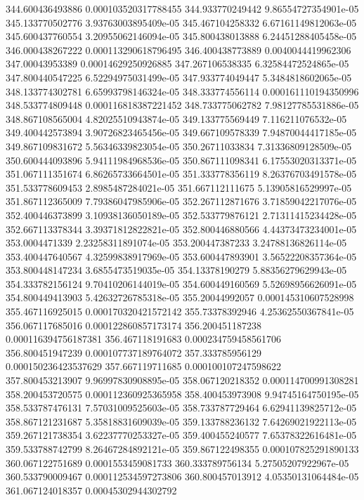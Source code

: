 {344.600436493886 0.000103520317788455
344.933770249442 9.86554727354901e-05
345.133770502776 3.93763003895409e-05
345.467104258332 6.67161149812063e-05
345.600437760554 3.20955062146094e-05
345.800438013888 6.24451288405458e-05
346.000438267222 0.000113290618796495
346.400438773889 0.0040044419962306
347.00043953389 0.00014629250926885
347.267106538335 6.32584472524865e-05
347.800440547225 6.52294975031499e-05
347.933774049447 5.3484818602065e-05
348.133774302781 6.65993798146324e-05
348.333774556114 0.000161110194350996
348.533774809448 0.000116818387221452
348.733775062782 7.98127785531886e-05
348.867108565004 4.82025510943874e-05
349.133775569449 7.116211076532e-05
349.400442573894 3.90726823465456e-05
349.667109578339 7.94870044417185e-05
349.867109831672 5.56346339823054e-05
350.26711033834 7.31336809128509e-05
350.600444093896 5.94111984968536e-05
350.867111098341 6.17553020313371e-05
351.067111351674 6.86265733664501e-05
351.333778356119 8.26376703491578e-05
351.533778609453 2.8985487284021e-05
351.667112111675 5.13905816529997e-05
351.867112365009 7.79386047985906e-05
352.267112871676 3.71859042217076e-05
352.400446373899 3.10938136050189e-05
352.533779876121 2.71311415234428e-05
352.667113378344 3.39371812822821e-05
352.800446880566 4.44373473234001e-05
353.0004471339 2.23258311891074e-05
353.200447387233 3.24788136826114e-05
353.400447640567 4.32599838917969e-05
353.600447893901 3.56522208357364e-05
353.800448147234 3.6855473519035e-05
354.13378190279 5.88356279629943e-05
354.333782156124 9.70410206144019e-05
354.600449160569 5.52698956626091e-05
354.800449413903 5.42632726785318e-05
355.20044992057 0.000145310607528998
355.467116925015 0.000170320421572142
355.73378392946 4.25362550367841e-05
356.067117685016 0.000122860857173174
356.200451187238 0.000116394756187381
356.467118191683 0.000234759458561706
356.800451947239 0.000107737189764072
357.333785956129 0.000150236423537629
357.667119711685 0.000100107247598622
357.800453213907 9.96997830908895e-05
358.067120218352 0.000114700991308281
358.200453720575 0.000112360925365958
358.400453973908 9.94745164750195e-05
358.533787476131 7.57031009525603e-05
358.733787729464 6.62941139825712e-05
358.867121231687 5.35818831609039e-05
359.133788236132 7.64269021922113e-05
359.267121738354 3.62237770253327e-05
359.400455240577 7.65378322616481e-05
359.533788742799 8.26467284892121e-05
359.867122498355 0.000107825291890133
360.067122751689 0.0001553459081733
360.333789756134 5.27505207922967e-05
360.533790009467 0.000112534597273806
360.800457013912 4.05350131064484e-05
361.067124018357 0.00045302944302792
}
